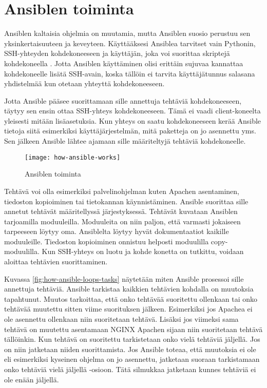 \section{Ansiblen toiminta}

Ansiblen kaltaisia ohjelmia on muutamia, mutta Ansiblen suosio perustuu sen yksinkertaisuuteen ja keveyteen. Käyttääksesi Ansiblea tarvitset vain Pythonin, SSH-yhteyden kohdekoneeseen ja käyttäjän, joka voi suorittaa skriptejä kohdekoneella \cite{link:what-is-ansible}. Jotta Ansiblen käyttäminen olisi erittäin sujuvaa kannattaa kohdekoneelle lisätä SSH-avain, koska tällöin ei tarvita käyttäjätunnus salasana yhdistelmää kun otetaan yhteyttä kohdekoneeseen.

Jotta Ansible pääsee suorittamaan sille annettuja tehtäviä kohdekoneeseen, täytyy sen ensin ottaa SSH-yhteys kohdekoneeseen. Tämä ei vaadi client-koneelta yleisesti mitään lisäasetuksia. Kun yhteys on saatu kohdekoneeseen kerää Ansible tietoja siitä esimerkiksi käyttäjärjestelmän, mitä paketteja on jo asennettu yms. Sen jälkeen Ansible lähtee ajamaan sille määriteltyjä tehtäviä kohdekoneelle.

\begin{figure}[h]
  \texttt{[image: how-ansible-works]}
  \caption{Ansiblen toiminta}
  \label{fig:how-ansible-works}
\end{figure}

Tehtävä voi olla esimerkiksi palvelinohjelman kuten Apachen asentaminen, tiedoston kopioiminen tai tietokannan käynnistäminen. Ansible suorittaa sille annetut tehtävät määritellyssä järjestyksessä. Tehtävät kuvataan Ansiblen tarjoamilla moduuleilla. Moduuleita on niin paljon, että varmasti jokaiseen tarpeeseen löytyy oma. Ansiblelta löytyy hyvät dokumentaatiot kaikille moduuleille. Tiedoston kopioiminen onnistuu helposti moduulilla copy-moduulilla. Kun SSH-yhteys on luotu ja kohde konetta on tutkittu, voidaan aloittaa tehtävien suorittaminen.

Kuvassa \ref{fig:how-ansible-loops-tasks} näytetään miten Ansible prosessoi sille annettuja tehtäviä. Ansible tarkistaa kaikkien tehtävien kohdalla on muutoksia tapahtunut. Muutos tarkoittaa, että onko tehtävää suoritettu ollenkaan tai onko tehtävää muutettu sitten viime suorituksen jälkeen. Esimerkiksi jos Apachea ei ole asennettu ollenkaan niin suoritetaan tehtävä. Lisäksi jos viimeksi sama tehtävä on muutettu asentamaan NGINX Apachen sijaan niin suoritetaan tehtävä tällöinkin. Kun tehtävä on suoritettu tarkistetaan onko vielä tehtäviä jäljellä. Jos on niin jatketaan niiden suorittamista. Jos Ansible toteaa, että muutoksia ei ole eli esimerkiksi kyseinen ohjelma on jo asennettu, jatketaan suoraan tarkistamaan onko tehtäviä vielä jäljellä -osioon. Tätä silmukkaa jatketaan kunnes tehtäviä ei ole enään jäljellä.

